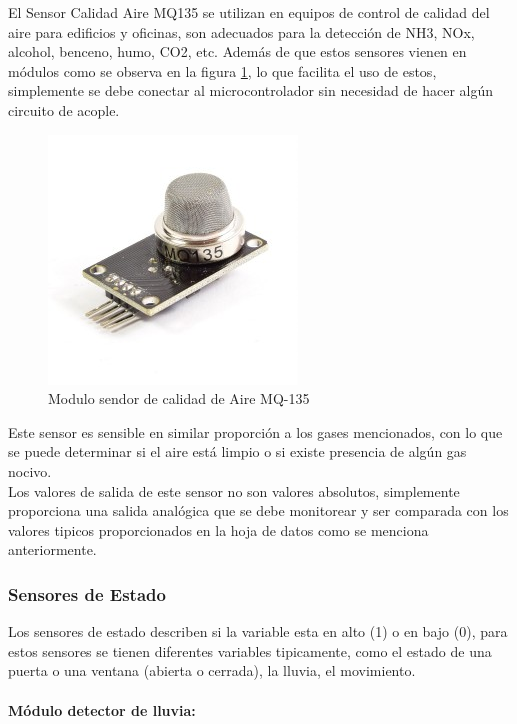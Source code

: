 El Sensor Calidad Aire MQ135 se utilizan en equipos de control de calidad del aire para edificios y oficinas, son adecuados para la detección de NH3, NOx, alcohol, benceno, humo, CO2, etc. Además de que estos sensores vienen en módulos como se observa en la figura \ref{fig:sensor-calidad-aire-mq135}, lo que facilita el uso de estos, simplemente se debe conectar al microcontrolador sin necesidad de hacer algún circuito de acople. \cite{MQ1}\\

\begin{figure}
	\centering
	\caption{Modulo sendor de calidad de Aire MQ-135 \cite{MQ1}}
	\label{fig:sensor-calidad-aire-mq135}
	\includegraphics[width=0.35\linewidth]{Imagenes/sensor-calidad-aire-mq135}
\end{figure}

Este sensor es sensible en similar proporción a los gases mencionados, con lo que se puede determinar si el aire está limpio o si existe presencia de algún gas nocivo.\\

Los valores de salida de este sensor no son valores absolutos, simplemente proporciona una salida analógica que se debe monitorear y ser comparada con los valores tipicos proporcionados en la hoja de datos como se menciona anteriormente.\cite{MQ2}

\subsubsection{Sensores de Estado}

Los sensores de estado describen si la variable esta en alto (1) o en bajo (0), para estos sensores se tienen diferentes variables tipicamente, como el estado de una puerta o una ventana (abierta o cerrada), la lluvia, el movimiento.

\paragraph{Módulo detector de lluvia: }

